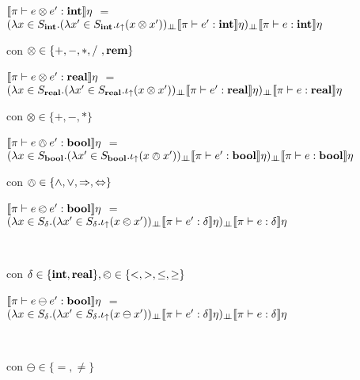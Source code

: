 \noindent
$\llbracket \pi \vdash e \otimes e' : \textbf{int} \rrbracket\eta$ $=$ \\
				\indent \indent \indent $(\lambda x \in S_{\textbf{int}} . 
											(\lambda x' \in S_{\textbf{int}} . \iota_{\uparrow} (x \otimes x'))_{\bot \!\!\! \bot}
													\llbracket \pi \vdash e' : \textbf{int} \rrbracket\eta)_{\bot \!\!\! \bot}
														\llbracket \pi \vdash e : \textbf{int} \rrbracket\eta$

\begin{center}
con $\otimes \in \{+,-,*,/\ , \textbf{rem}\}$
\end{center}

\noindent
$\llbracket \pi \vdash e \otimes e' : \textbf{real} \rrbracket\eta$ $=$ \\
				\indent \indent \indent $(\lambda x \in S_{\textbf{real}} . 
											(\lambda x' \in S_{\textbf{real}} . \iota_{\uparrow} (x \otimes x'))_{\bot \!\!\! \bot}
													\llbracket \pi \vdash e' : \textbf{real} \rrbracket\eta)_{\bot \!\!\! \bot}
														\llbracket \pi \vdash e : \textbf{real} \rrbracket\eta$

\begin{center}
con $\otimes \in \{+,-,*\}$
\end{center}

\noindent
$\llbracket \pi \vdash e \owedge e' : \textbf{bool} \rrbracket\eta$ $=$ \\
				\indent \indent \indent $(\lambda x \in S_{\textbf{bool}} . 
											(\lambda x' \in S_{\textbf{bool}} . \iota_{\uparrow} (x \owedge x'))_{\bot \!\!\! \bot}
													\llbracket \pi \vdash e' : \textbf{bool} \rrbracket\eta)_{\bot \!\!\! \bot}
														\llbracket \pi \vdash e : \textbf{bool} \rrbracket\eta$

\begin{center}
con $\owedge \in \{\wedge,\vee,\Rightarrow,\Leftrightarrow\}$
\end{center}

\begin{center}

$\llbracket \pi \vdash e \olessthan e' : \textbf{bool} \rrbracket\eta$ $=$ $(\lambda x \in S_\delta . 
											(\lambda x' \in S_\delta . \iota_{\uparrow} (x \olessthan x'))_{\bot \!\!\! \bot}
													\llbracket \pi \vdash e' : \delta \rrbracket\eta)_{\bot \!\!\! \bot}
														\llbracket \pi \vdash e : \delta \rrbracket\eta$

\

con $\delta \in \{\textbf{int}, \textbf{real} \}, \olessthan \in \{<,>,\leq,\geq\}$
\end{center}

\begin{center}

$\llbracket \pi \vdash e \ominus e' : \textbf{bool} \rrbracket\eta$ $=$ $(\lambda x \in S_\delta . 
											(\lambda x' \in S_\delta . \iota_{\uparrow} (x \ominus x'))_{\bot \!\!\! \bot}
													\llbracket \pi \vdash e' : \delta \rrbracket\eta)_{\bot \!\!\! \bot}
														\llbracket \pi \vdash e : \delta \rrbracket\eta$

\

con $\ominus \in \{=,\neq\}$
\end{center}


